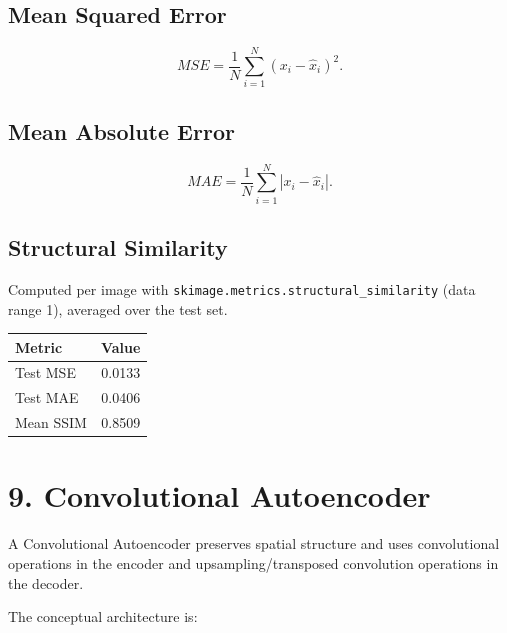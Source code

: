 \documentclass[10pt]{article}
\begin{document}
\subsection*{Mean Squared Error}

\[
MSE=
\frac{1}{N}
\sum_{i=1}^{N}
(x_i-\hat{x}_i)^2.
\]

\subsection*{Mean Absolute Error}

\[
MAE=
\frac{1}{N}
\sum_{i=1}^{N}
|x_i-\hat{x}_i|.
\]

\subsection*{Structural Similarity}

Computed per image with \texttt{skimage.metrics.structural\_similarity} (data range 1), averaged over the test set.

\begin{center}
\begin{tabular}{|l|c|}
\hline
Metric & Value\\
\hline
Test MSE & 0.0133\\
Test MAE & 0.0406\\
Mean SSIM & 0.8509\\
\hline
\end{tabular}
\end{center}

\section*{9. Convolutional Autoencoder}

A Convolutional Autoencoder preserves spatial structure and uses convolutional
operations in the encoder and upsampling/transposed convolution operations
in the decoder.

The conceptual architecture is:

\begin{center}
\end{center}
\end{document}
